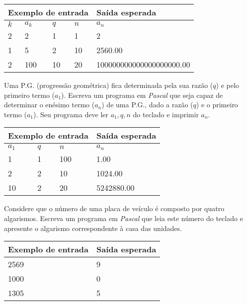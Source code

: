 \begin{center}
\begin{tabular}{|l|l|l|l|l|} \hline
\multicolumn{4}{|c|}{Exemplo de entrada} & Saída esperada \\ \hline
$k$ & $a_k$ & $q$ & $n$  & $a_n$               \\ \hline
2 & 2 & 1 & 1        & 2                \\ \hline
1 & 5 & 2 & 10       & 2560.00             \\ \hline
2 & 100 & 10 & 20    & 100000000000000000000.00               \\ \hline
\end{tabular}
\end{center}

\item Uma P.G. (progressão geométrica) fica determinada pela sua razão ($q$) 
e pelo primeiro termo ($a_1$). Escreva um programa em \emph{Pascal} que 
seja capaz de determinar o enésimo termo ($a_n$) de uma P.G., dado a razão 
($q$) e o primeiro termo ($a_1$). Seu programa deve ler $a_1, q, n$ do 
teclado e imprimir $a_n$.

\begin{center}
\begin{tabular}{|l|l|l|l|} \hline
\multicolumn{3}{|c|}{Exemplo de entrada} & Saída esperada \\ \hline
$a_1$ & $q$ & $n$   & $a_n$               \\ \hline
1 & 1 & 100         & 1.00                \\ \hline
2 & 2 & 10          & 1024.00             \\ \hline
10 & 2 & 20         & 5242880.00          \\ \hline
\end{tabular}
\end{center}

\item Considere que o número de uma placa de veículo é composto por quatro 
algarismos. Escreva um programa em \emph{Pascal} que leia este número  do
teclado e apresente o algarismo correspondente à casa das unidades.

\begin{center}
\begin{tabular}{|l|l|} \hline
Exemplo de entrada & Saída esperada \\ \hline
2569                & 9               \\ \hline
1000                & 0               \\ \hline
1305                & 5               \\ \hline
\end{tabular}
\end{center}

